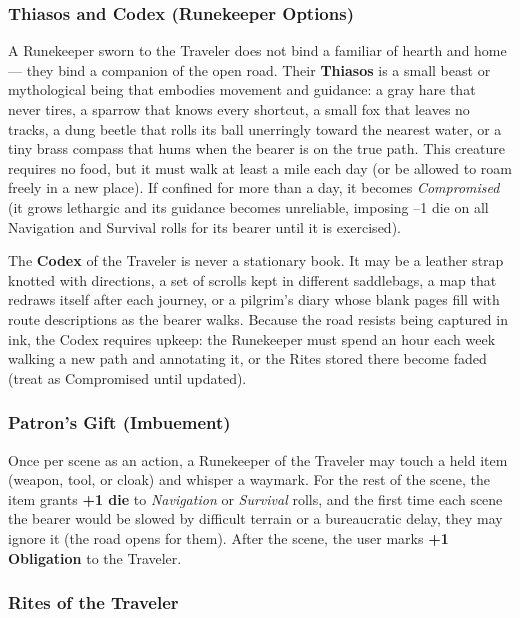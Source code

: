 \subsubsection*{Thiasos and Codex (Runekeeper Options)}

A Runekeeper sworn to the Traveler does not bind a familiar of hearth and home --- they bind a companion of the open road. Their \textbf{Thiasos} is a small beast or mythological being that embodies movement and guidance: a gray hare that never tires, a sparrow that knows every shortcut, a small fox that leaves no tracks, a dung beetle that rolls its ball unerringly toward the nearest water, or a tiny brass compass that hums when the bearer is on the true path. This creature requires no food, but it must walk at least a mile each day (or be allowed to roam freely in a new place). If confined for more than a day, it becomes \textit{Compromised} (it grows lethargic and its guidance becomes unreliable, imposing --1 die on all Navigation and Survival rolls for its bearer until it is exercised).

The \textbf{Codex} of the Traveler is never a stationary book. It may be a leather strap knotted with directions, a set of scrolls kept in different saddlebags, a map that redraws itself after each journey, or a pilgrim's diary whose blank pages fill with route descriptions as the bearer walks. Because the road resists being captured in ink, the Codex requires upkeep: the Runekeeper must spend an hour each week walking a new path and annotating it, or the Rites stored there become faded (treat as Compromised until updated).

\subsubsection*{Patron's Gift (Imbuement)}

Once per scene as an action, a Runekeeper of the Traveler may touch a held item (weapon, tool, or cloak) and whisper a waymark. For the rest of the scene, the item grants \textbf{+1 die} to \textit{Navigation} or \textit{Survival} rolls, and the first time each scene the bearer would be slowed by difficult terrain or a bureaucratic delay, they may ignore it (the road opens for them). After the scene, the user marks \textbf{+1 Obligation} to the Traveler.

\subsubsection*{Rites of the Traveler}

